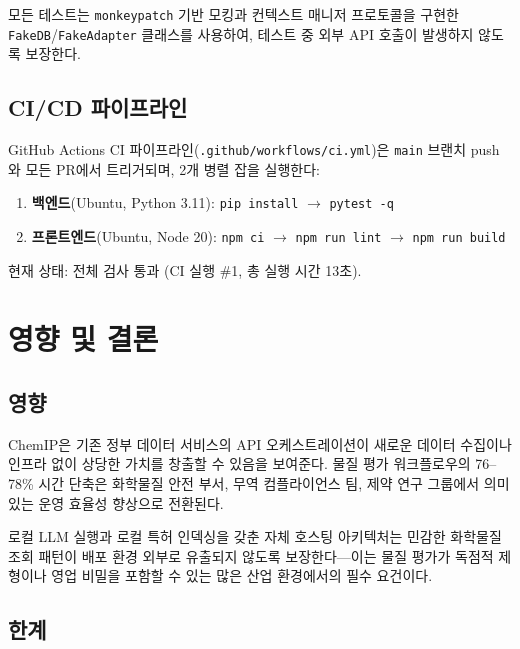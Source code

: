 \documentclass[preprint,12pt]{elsarticle}
\begin{document}
모든 테스트는 \texttt{monkeypatch} 기반 모킹과 컨텍스트 매니저 프로토콜을 구현한 \texttt{FakeDB}/\texttt{FakeAdapter} 클래스를 사용하여, 테스트 중 외부 API 호출이 발생하지 않도록 보장한다.

\subsection{CI/CD 파이프라인}

GitHub Actions CI 파이프라인(\texttt{.github/workflows/ci.yml})은 \texttt{main} 브랜치 push와 모든 PR에서 트리거되며, 2개 병렬 잡을 실행한다:

\begin{enumerate}
  \item \textbf{백엔드}(Ubuntu, Python 3.11): \texttt{pip install} $\rightarrow$ \texttt{pytest -q}
  \item \textbf{프론트엔드}(Ubuntu, Node 20): \texttt{npm ci} $\rightarrow$ \texttt{npm run lint} $\rightarrow$ \texttt{npm run build}
\end{enumerate}

현재 상태: 전체 검사 통과 (CI 실행 \#1, 총 실행 시간 13초).

\section{영향 및 결론}
\label{sec:impact}

\subsection{영향}

ChemIP은 기존 정부 데이터 서비스의 API 오케스트레이션이 새로운 데이터 수집이나 인프라 없이 상당한 가치를 창출할 수 있음을 보여준다. 물질 평가 워크플로우의 76--78\% 시간 단축은 화학물질 안전 부서, 무역 컴플라이언스 팀, 제약 연구 그룹에서 의미 있는 운영 효율성 향상으로 전환된다.

로컬 LLM 실행과 로컬 특허 인덱싱을 갖춘 자체 호스팅 아키텍처는 민감한 화학물질 조회 패턴이 배포 환경 외부로 유출되지 않도록 보장한다---이는 물질 평가가 독점적 제형이나 영업 비밀을 포함할 수 있는 많은 산업 환경에서의 필수 요건이다.

\subsection{한계}
\end{document}
